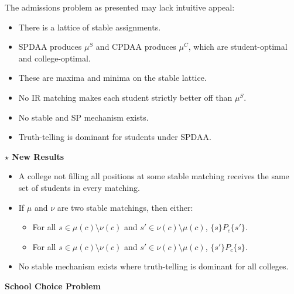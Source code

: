 \documentclass[8pt]{scrartcl}
\renewcommand{\section}[1]{\begin{center}\textbf{\color{red}#1}\end{center}}
\renewcommand{\subsection}[1]{

\noindent \textbf{\color{red} $\star$ #1}}
\begin{document}
\begin{multicols*}{2}
The admissions problem as presented may lack intuitive appeal:
\begin{itemize}
    \item There is a lattice of stable assignments.
    \item SPDAA produces $\mu^S$ and CPDAA produces $\mu^C$, which are student-optimal and college-optimal.
    \item These are maxima and minima on the stable lattice.
    \item No IR matching makes each student strictly better off than $\mu^S$.
    \item No stable and SP mechanism exists.
    \item Truth-telling is dominant for students under SPDAA.
\end{itemize}

\subsection{New Results}

\begin{itemize}
    \item A college not filling all positions at some stable matching receives the same set of students in every matching.
    \item If $\mu$ and $\nu$ are two stable matchings, then either:
    \begin{itemize}
        \item For all $s \in \mu(c) \setminus \nu(c)$ and $s' \in \nu(c) \setminus \mu(c)$, $\{s\} P_c \{s'\}$.
        \item For all $s \in \mu(c) \setminus \nu(c)$ and $s' \in \nu(c) \setminus \mu(c)$, $\{s'\} P_c \{s\}$.
    \end{itemize}
    \item No stable mechanism exists where truth-telling is dominant for all colleges.
\end{itemize}

\section{School Choice Problem}


\end{multicols*}
\end{document}
